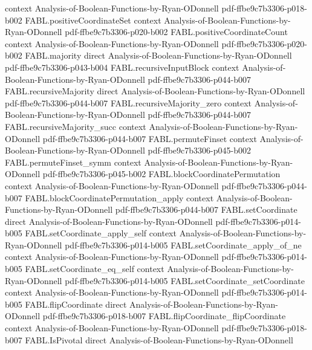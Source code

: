 \begin{theorem}
  {context}
  {Analysis-of-Boolean-Functions-by-Ryan-ODonnell}
  {pdf-ffbe9c7b3306-p018-b002}
\proofstep
  {FABL.positiveCoordinateSet}
  {context}
  {Analysis-of-Boolean-Functions-by-Ryan-ODonnell}
  {pdf-ffbe9c7b3306-p020-b002}
\proofstep
  {FABL.positiveCoordinateCount}
  {context}
  {Analysis-of-Boolean-Functions-by-Ryan-ODonnell}
  {pdf-ffbe9c7b3306-p020-b002}
\proofstep
  {FABL.majority}
  {direct}
  {Analysis-of-Boolean-Functions-by-Ryan-ODonnell}
  {pdf-ffbe9c7b3306-p043-b004}
\proofstep
  {FABL.recursiveInputBlock}
  {context}
  {Analysis-of-Boolean-Functions-by-Ryan-ODonnell}
  {pdf-ffbe9c7b3306-p044-b007}
\proofstep
  {FABL.recursiveMajority}
  {direct}
  {Analysis-of-Boolean-Functions-by-Ryan-ODonnell}
  {pdf-ffbe9c7b3306-p044-b007}
\proofstep
  {FABL.recursiveMajority_zero}
  {context}
  {Analysis-of-Boolean-Functions-by-Ryan-ODonnell}
  {pdf-ffbe9c7b3306-p044-b007}
\proofstep
  {FABL.recursiveMajority_succ}
  {context}
  {Analysis-of-Boolean-Functions-by-Ryan-ODonnell}
  {pdf-ffbe9c7b3306-p044-b007}
\proofstep
  {FABL.permuteFinset}
  {context}
  {Analysis-of-Boolean-Functions-by-Ryan-ODonnell}
  {pdf-ffbe9c7b3306-p045-b002}
\proofstep
  {FABL.permuteFinset_symm}
  {context}
  {Analysis-of-Boolean-Functions-by-Ryan-ODonnell}
  {pdf-ffbe9c7b3306-p045-b002}
\proofstep
  {FABL.blockCoordinatePermutation}
  {context}
  {Analysis-of-Boolean-Functions-by-Ryan-ODonnell}
  {pdf-ffbe9c7b3306-p044-b007}
\proofstep
  {FABL.blockCoordinatePermutation_apply}
  {context}
  {Analysis-of-Boolean-Functions-by-Ryan-ODonnell}
  {pdf-ffbe9c7b3306-p044-b007}
\proofstep
  {FABL.setCoordinate}
  {direct}
  {Analysis-of-Boolean-Functions-by-Ryan-ODonnell}
  {pdf-ffbe9c7b3306-p014-b005}
\proofstep
  {FABL.setCoordinate_apply_self}
  {context}
  {Analysis-of-Boolean-Functions-by-Ryan-ODonnell}
  {pdf-ffbe9c7b3306-p014-b005}
\proofstep
  {FABL.setCoordinate_apply_of_ne}
  {context}
  {Analysis-of-Boolean-Functions-by-Ryan-ODonnell}
  {pdf-ffbe9c7b3306-p014-b005}
\proofstep
  {FABL.setCoordinate_eq_self}
  {context}
  {Analysis-of-Boolean-Functions-by-Ryan-ODonnell}
  {pdf-ffbe9c7b3306-p014-b005}
\proofstep
  {FABL.setCoordinate_setCoordinate}
  {context}
  {Analysis-of-Boolean-Functions-by-Ryan-ODonnell}
  {pdf-ffbe9c7b3306-p014-b005}
\proofstep
  {FABL.flipCoordinate}
  {direct}
  {Analysis-of-Boolean-Functions-by-Ryan-ODonnell}
  {pdf-ffbe9c7b3306-p018-b007}
\proofstep
  {FABL.flipCoordinate_flipCoordinate}
  {context}
  {Analysis-of-Boolean-Functions-by-Ryan-ODonnell}
  {pdf-ffbe9c7b3306-p018-b007}
\proofstep
  {FABL.IsPivotal}
  {direct}
  {Analysis-of-Boolean-Functions-by-Ryan-ODonnell}

\end{theorem}
